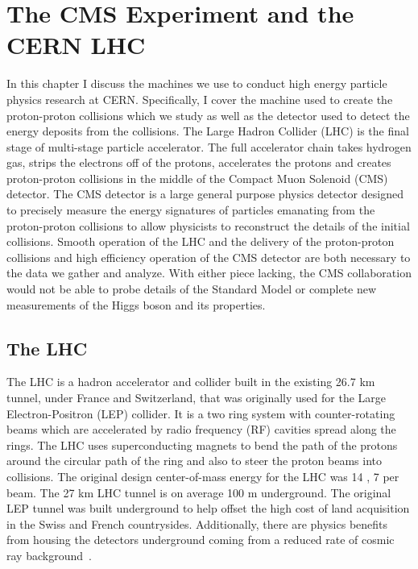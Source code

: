 \chapter{The CMS Experiment and the CERN LHC}
In this chapter I discuss the machines we use to conduct high energy particle
physics research at CERN. Specifically, I cover the machine used to create the
proton-proton collisions which we study as well as the
detector used to detect the energy deposits from the collisions. The Large Hadron
Collider (LHC) is the final stage of multi-stage particle accelerator. The full
accelerator chain takes hydrogen gas, strips the electrons off of the protons,
accelerates the protons and creates proton-proton collisions in the middle of the
Compact Muon Solenoid (CMS) detector. The CMS detector is a large general purpose 
physics detector designed to precisely measure the energy signatures of particles
emanating from the proton-proton collisions to allow physicists to reconstruct
the details of the initial collisions. Smooth operation of the LHC and the delivery
of the proton-proton collisions and high efficiency operation of the CMS detector
are both necessary to the data we gather and analyze. With either piece lacking,
the CMS collaboration would not be able to probe details of the Standard Model
or complete new measurements of the Higgs boson and its properties.


\section{The LHC}
The LHC is a hadron accelerator and collider built in the existing 26.7 km tunnel,
under France and Switzerland, that was originally used for the Large Electron-Positron (LEP)
collider. It is a two ring system with counter-rotating beams which are accelerated by
radio frequency (RF) cavities spread along the rings. The LHC uses superconducting magnets to 
bend the path of the protons around the circular path of the ring and also to steer
the proton beams into collisions. The original design center-of-mass energy for the LHC
was 14 \TeV, 7 \TeV per beam. The 27 km LHC tunnel is on average 100 m underground.
The original LEP tunnel was built underground to help offset the high cost of land
acquisition in the Swiss and French countrysides. Additionally, there are physics
benefits from housing the detectors underground coming from a reduced rate of cosmic
ray background~\cite{Voss:2009zz}.

